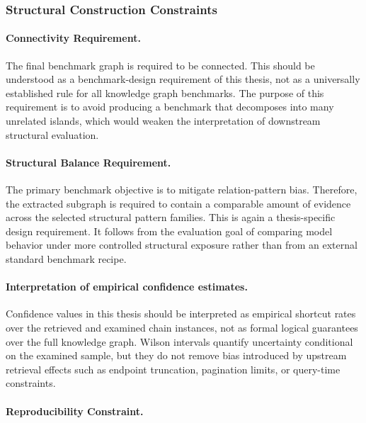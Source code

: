 \documentclass[12pt,a4paper]{article}
\begin{document}
\subsubsection{Structural Construction Constraints}

\paragraph{Connectivity Requirement.}

The final benchmark graph is required to be connected. This should be understood as a benchmark-design requirement of this thesis, not as a universally established rule for all knowledge graph benchmarks. The purpose of this requirement is to avoid producing a benchmark that decomposes into many unrelated islands, which would weaken the interpretation of downstream structural evaluation.

\paragraph{Structural Balance Requirement.}

The primary benchmark objective is to mitigate relation-pattern bias. Therefore, the extracted subgraph is required to contain a comparable amount of evidence across the selected structural pattern families. This is again a thesis-specific design requirement. It follows from the evaluation goal of comparing model behavior under more controlled structural exposure rather than from an external standard benchmark recipe.

\paragraph{Interpretation of empirical confidence estimates.}

Confidence values in this thesis should be interpreted as empirical shortcut rates over the retrieved and examined chain instances, not as formal logical guarantees over the full knowledge graph. Wilson intervals quantify uncertainty conditional on the examined sample, but they do not remove bias introduced by upstream retrieval effects such as endpoint truncation, pagination limits, or query-time constraints.

\paragraph{Reproducibility Constraint.}
\end{document}
